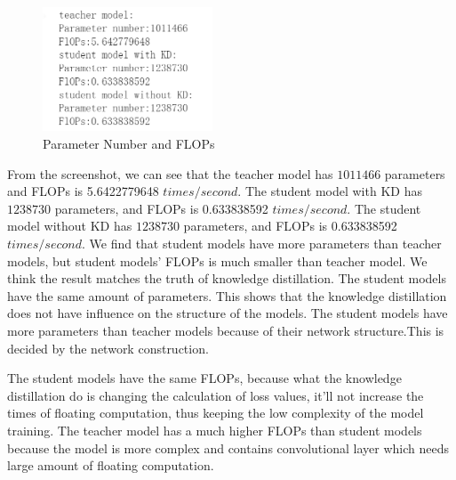 \documentclass[conference]{IEEEtran}
\begin{document}
  \begin{figure}[h] 
      \centering
      \includegraphics[width=0.45\textwidth]{./graphs/T1Q8.png}
      \caption{Parameter Number and FLOPs}
      \label{Fig.t1q3e}
  \end{figure}
  From the screenshot, we can see that the teacher model has $1011466$ parameters and FLOPs is 5.6422779648 $times/second$. 
  The student model with KD has $1238730$ parameters, and FLOPs is 0.633838592 $times/second$. 
  The student model without KD has $1238730$ parameters, and FLOPs is 0.633838592 $times/second$. 
  We find that student models have more parameters than teacher models, but student models' FLOPs is much smaller than teacher model. We think the result matches the truth of knowledge distillation.
  The student models have the same amount of parameters. This shows that the knowledge distillation does not have influence on the structure of the models. The student models have more parameters than teacher models because of their network structure.This is decided by the network construction. \par
  The student models have the same FLOPs, because what the knowledge distillation do is changing the calculation of loss values, it'll not increase the times of floating computation, thus keeping the low complexity of the model training. The teacher model has a much higher FLOPs than student models because the model is more complex and contains convolutional layer which needs large amount of floating computation.
\end{document}
